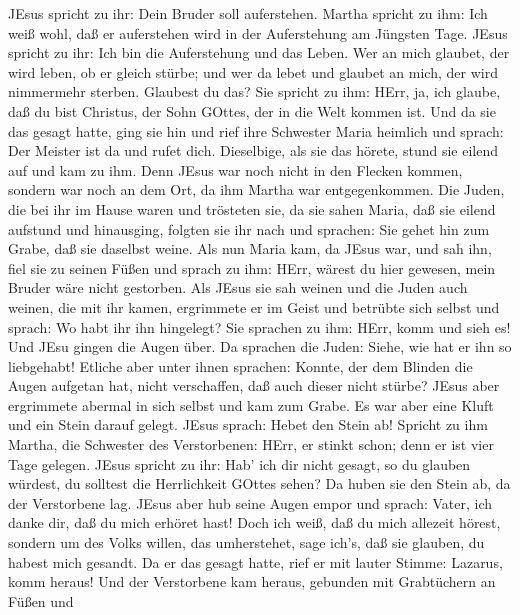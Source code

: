  JEsus spricht zu ihr: Dein Bruder soll auferstehen.
 Martha spricht zu ihm: Ich weiß wohl, daß er auferstehen
wird in der Auferstehung am Jüngsten Tage.  JEsus spricht
zu ihr: Ich bin die Auferstehung und das Leben. Wer an mich glaubet, der
wird leben, ob er gleich stürbe;  und wer da lebet und
glaubet an mich, der wird nimmermehr sterben. Glaubest du das?
 Sie spricht zu ihm: HErr, ja, ich glaube, daß du bist
Christus, der Sohn GOttes, der in die Welt kommen ist.  Und
da sie das gesagt hatte, ging sie hin und rief ihre Schwester Maria
heimlich und sprach: Der Meister ist da und rufet dich. 
Dieselbige, als sie das hörete, stund sie eilend auf und kam zu ihm.
 Denn JEsus war noch nicht in den Flecken kommen, sondern
war noch an dem Ort, da ihm Martha war entgegenkommen.  Die
Juden, die bei ihr im Hause waren und trösteten sie, da sie sahen Maria,
daß sie eilend aufstund und hinausging, folgten sie ihr nach und
sprachen: Sie gehet hin zum Grabe, daß sie daselbst weine. 
Als nun Maria kam, da JEsus war, und sah ihn, fiel sie zu seinen Füßen
und sprach zu ihm: HErr, wärest du hier gewesen, mein Bruder wäre nicht
gestorben.  Als JEsus sie sah weinen und die Juden auch
weinen, die mit ihr kamen, ergrimmete er im Geist und betrübte sich
selbst  und sprach: Wo habt ihr ihn hingelegt? Sie sprachen
zu ihm: HErr, komm und sieh es!  Und JEsu gingen die Augen
über.  Da sprachen die Juden: Siehe, wie hat er ihn so
liebgehabt!  Etliche aber unter ihnen sprachen: Konnte, der
dem Blinden die Augen aufgetan hat, nicht verschaffen, daß auch dieser
nicht stürbe?  JEsus aber ergrimmete abermal in sich selbst
und kam zum Grabe. Es war aber eine Kluft und ein Stein darauf gelegt.
 JEsus sprach: Hebet den Stein ab! Spricht zu ihm Martha,
die Schwester des Verstorbenen: HErr, er stinkt schon; denn er ist vier
Tage gelegen.  JEsus spricht zu ihr: Hab' ich dir nicht
gesagt, so du glauben würdest, du solltest die Herrlichkeit GOttes
sehen?  Da huben sie den Stein ab, da der Verstorbene lag.
JEsus aber hub seine Augen empor und sprach: Vater, ich danke dir, daß
du mich erhöret hast!  Doch ich weiß, daß du mich allezeit
hörest, sondern um des Volks willen, das umherstehet, sage ich's, daß
sie glauben, du habest mich gesandt.  Da er das gesagt
hatte, rief er mit lauter Stimme: Lazarus, komm heraus! 
Und der Verstorbene kam heraus, gebunden mit Grabtüchern an Füßen und
